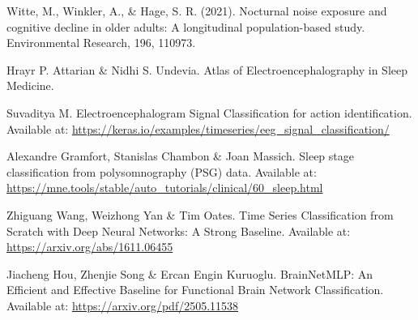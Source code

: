 \begin{thebibliography}{9}
Witte, M., Winkler, A., \& Hage, S. R. (2021). Nocturnal noise exposure and cognitive decline in older adults: A longitudinal population-based study. Environmental Research, 196, 110973.

Hrayr P. Attarian \& Nidhi S. Undevia. Atlas of Electroencephalography in Sleep Medicine. 

Suvaditya M. Electroencephalogram Signal Classification for action identification. Available at: \href{https://keras.io/examples/timeseries/eeg_signal_classification/}{https://keras.io/examples/timeseries/eeg\_signal\_classification/}

Alexandre Gramfort, Stanislas Chambon \& Joan Massich. Sleep stage classification from polysomnography (PSG) data. Available at: \href{https://mne.tools/stable/auto_tutorials/clinical/60_sleep.html}{https://mne.tools/stable/auto\_tutorials/clinical/60\_sleep.html}

Zhiguang Wang, Weizhong Yan \& Tim Oates. Time Series Classification from Scratch with Deep Neural Networks: A Strong Baseline. Available at: \href{https://arxiv.org/abs/1611.06455}{https://arxiv.org/abs/1611.06455}

Jiacheng Hou, Zhenjie Song \& Ercan Engin Kuruoglu. BrainNetMLP: An Efficient and Effective Baseline for Functional Brain Network Classification. Available at: \href{https://arxiv.org/pdf/2505.11538}{https://arxiv.org/pdf/2505.11538}

\end{thebibliography}

